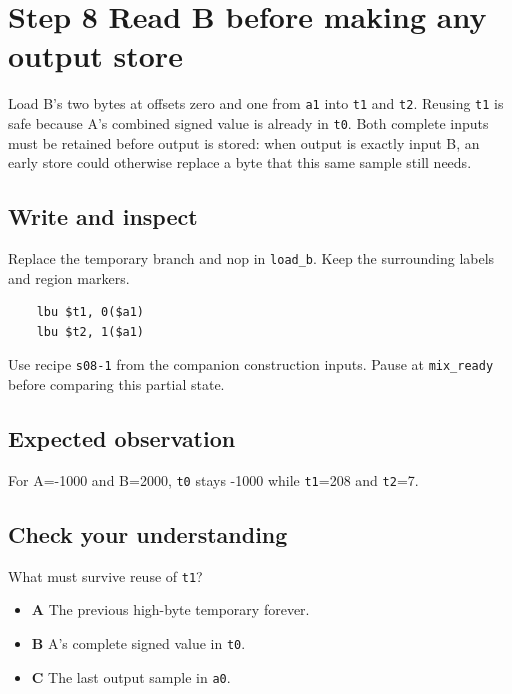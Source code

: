 \section{Step 8 Read B before making any output store}\label{pcm-s08}

Load B’s two bytes at offsets zero and one from \texttt{a1} into \texttt{t1} and \texttt{t2}. Reusing \texttt{t1} is safe because A’s combined signed value is already in \texttt{t0}. Both complete inputs must be retained before output is stored: when output is exactly input B, an early store could otherwise replace a byte that this same sample still needs.

\subsection{Write and inspect}
Replace the temporary branch and nop in \texttt{load\_b}. Keep the surrounding labels and region markers.

\begin{verbatim}
    lbu $t1, 0($a1)
    lbu $t2, 1($a1)
\end{verbatim}
Use recipe \texttt{s08-1} from the companion construction inputs. Pause at \texttt{mix\_ready} before comparing this partial state.

\subsection{Expected observation}
For A=-1000 and B=2000, \texttt{t0} stays -1000 while \texttt{t1}=208 and \texttt{t2}=7.

\subsection{Check your understanding}
What must survive reuse of \texttt{t1}?

\begin{itemize}
  \item \textbf{A} The previous high-byte temporary forever.
  \item \textbf{B} A’s complete signed value in \texttt{t0}.
  \item \textbf{C} The last output sample in \texttt{a0}.
\end{itemize}
